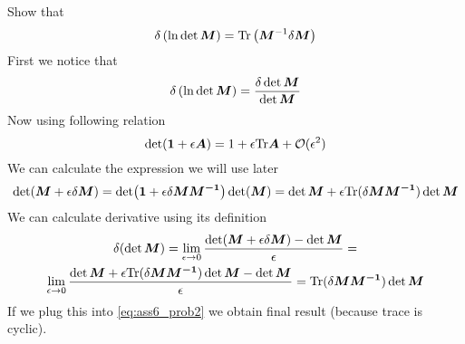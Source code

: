 \problem

Show that
%
\begin{equation}
    \delta \left(\ln \det \boldsymbol{M} \right) = \text{Tr}\left(\boldsymbol{M}^{-1}\delta \boldsymbol{M}\right)
    \label{eq:ass6_sol2}
\end{equation}
%
First we notice that
%
\begin{equation}
    \delta \left(\ln \det \boldsymbol{M} \right) = 
    \frac{\delta \det \boldsymbol{M}}{\det \boldsymbol{M}} 
    \label{eq:ass6_prob2}
\end{equation}
%
Now using following relation
%
\begin{equation}
    \det(\boldsymbol{1}+\epsilon \boldsymbol{A}) = 
    1 + \epsilon\text{Tr}\boldsymbol{A} + \mathcal{O}(\epsilon^2)
\end{equation}
%
We can calculate the expression we will use later
%
\begin{equation}
    \det(\boldsymbol{M}+\epsilon\delta\boldsymbol{M}) = 
    \det(\boldsymbol{1}+\epsilon\delta\boldsymbol{M}\boldsymbol{M^{-1}})\det(\boldsymbol{M}) =
    \det\boldsymbol{M} + \epsilon\text{Tr}(\delta\boldsymbol{M}\boldsymbol{M^{-1}})\det\boldsymbol{M}
\end{equation}
%
We can calculate derivative using its definition
%
\begin{multline}
    \delta(\det \boldsymbol{M}) = 
    \lim_{\epsilon\to0}\frac{\det(\boldsymbol{M}+\epsilon\delta\boldsymbol{M}) - \det \boldsymbol{M}}{\epsilon} =\\
    \lim_{\epsilon\to0}\frac{\det\boldsymbol{M} + \epsilon\text{Tr}(\delta\boldsymbol{M}\boldsymbol{M^{-1}})\det\boldsymbol{M} - \det \boldsymbol{M}}{\epsilon} =
    \text{Tr}(\delta\boldsymbol{M}\boldsymbol{M^{-1}})\det\boldsymbol{M}
\end{multline}
%
If we plug this into \cref{eq:ass6_prob2} we obtain final result (because trace
is cyclic).

\problem


